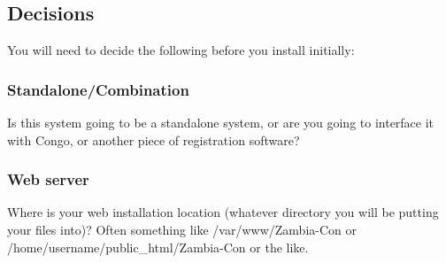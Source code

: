 \documentclass[captions=tablesignature]{scrartcl}
\begin{document}
\subsection{Decisions}
\label{sec-1-2}
You will need to decide the following before you install initially:
\subsubsection{Standalone/Combination}
\label{sec-1-2-1}
Is this system going to be a standalone system, or are you going
to interface it with Congo, or another piece of registration software?

\subsubsection{Web server}
\label{sec-1-2-2}
Where is your web installation location (whatever directory you
will be putting your files into)?  Often something like
/var/www/Zambia-Con or /home/username/public\_html/Zambia-Con or
the like.
\end{document}
